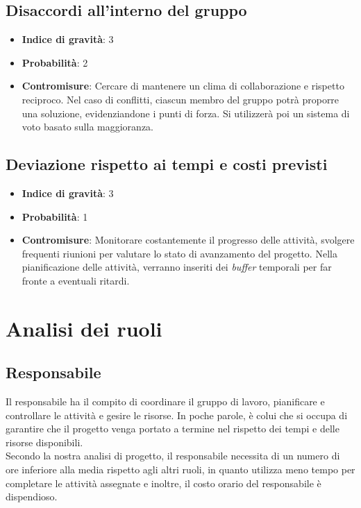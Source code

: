 \documentclass[italian,12pt]{article} %
\begin{document}
\subsection{Disaccordi all'interno del gruppo}
\begin{itemize}
	\item \textbf{Indice di gravità}: 3
	\item \textbf{Probabilità}: 2
	\item \textbf{Contromisure}:
	      Cercare di mantenere un clima di collaborazione e rispetto reciproco. Nel caso di conflitti,
	      ciascun membro del gruppo potrà proporre una soluzione, evidenziandone i punti di forza.
	      Si utilizzerà poi un sistema di voto basato sulla maggioranza.
\end{itemize}

\subsection{Deviazione rispetto ai tempi e costi previsti}
\begin{itemize}
	\item \textbf{Indice di gravità}: 3
	\item \textbf{Probabilità}: 1
	\item \textbf{Contromisure}: Monitorare costantemente il progresso delle attività, svolgere frequenti riunioni per valutare lo stato di avanzamento del progetto.
	      Nella pianificazione delle attività, verranno inseriti dei \textit{buffer} temporali per far fronte a eventuali ritardi.

\end{itemize}

\section{Analisi dei ruoli}
\subsection{Responsabile}
Il responsabile ha il compito di coordinare il gruppo di lavoro, pianificare e controllare le attività e gesire le risorse.
In poche parole, è colui che si occupa di garantire che il progetto venga portato a termine nel rispetto dei tempi e delle risorse disponibili.\\
Secondo la nostra analisi di progetto, il responsabile necessita di un numero di ore inferiore alla media rispetto agli altri ruoli, in quanto utilizza meno tempo per completare le attività assegnate e inoltre,
il costo orario del responsabile è dispendioso.
\end{document}
